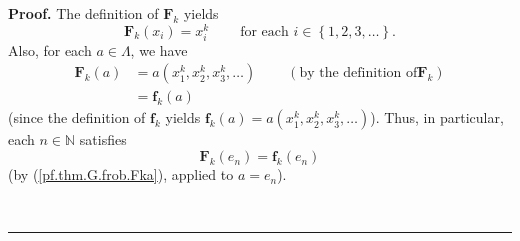 \documentclass[numbers=enddot,12pt,final,onecolumn,notitlepage]{scrartcl}%
\theoremstyle{definition}
\newenvironment{proof}[1][Proof]{\noindent\textbf{#1.} }{\ \rule{0.5em}{0.5em}}
\begin{document}
\begin{proof}
The definition of $\mathbf{F}_{k}$ yields%
\begin{equation}
\mathbf{F}_{k}\left(  x_{i}\right)  =x_{i}^{k}\ \ \ \ \ \ \ \ \ \ \text{for
each }i\in\left\{  1,2,3,\ldots\right\}  . \label{pf.thm.G.frob.Fkxi}%
\end{equation}
Also, for each $a\in\Lambda$, we have%
\begin{align}
\mathbf{F}_{k}\left(  a\right)   &  =a\left(  x_{1}^{k},x_{2}^{k},x_{3}%
^{k},\ldots\right)  \ \ \ \ \ \ \ \ \ \ \left(  \text{by the definition of
}\mathbf{F}_{k}\right) \nonumber\\
&  =\mathbf{f}_{k}\left(  a\right)  \label{pf.thm.G.frob.Fka}%
\end{align}
(since the definition of $\mathbf{f}_{k}$ yields $\mathbf{f}_{k}\left(
a\right)  =a\left(  x_{1}^{k},x_{2}^{k},x_{3}^{k},\ldots\right)  $). Thus, in
particular, each $n\in\mathbb{N}$ satisfies%
\begin{equation}
\mathbf{F}_{k}\left(  e_{n}\right)  =\mathbf{f}_{k}\left(  e_{n}\right)
\label{pf.thm.G.frob.Fken}%
\end{equation}
(by (\ref{pf.thm.G.frob.Fka}), applied to $a=e_{n}$).


\end{proof}
\end{document}
